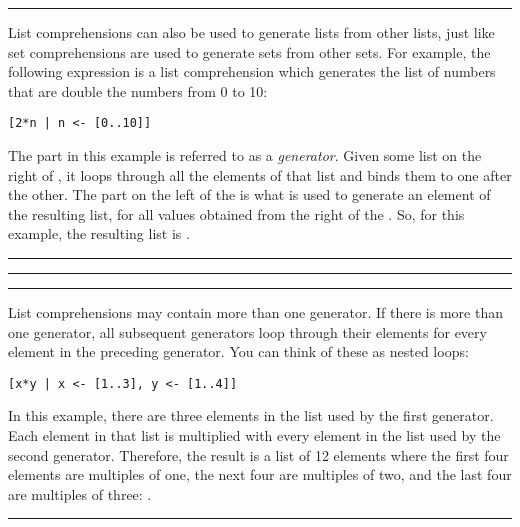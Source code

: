 \bigskip
\hrule
\bigskip
\pagebreak

List comprehensions can also be used to generate lists from other lists, just like set comprehensions are used to generate sets from other sets. For example, the following expression is a list comprehension which generates the list of numbers that are double the numbers from 0 to 10:
\begin{verbatim}
[2*n | n <- [0..10]]
\end{verbatim}
The  part in this example is referred to as a \emph{generator}. Given some list on the right of \haskellIn{<-}, it loops through all the elements of that list and binds them to  one after the other. The part on the left of the \haskellIn{|} is what is used to generate an element of the resulting list, for all values obtained from the right of the \haskellIn{|}. So, for this example, the resulting list is \haskellIn{[0,2,4,6,8,10,12,14,16,18,20]}.

\bigskip
\hrule
\bigskip


\bigskip
\hrule
\bigskip


\bigskip
\hrule
\bigskip

List comprehensions may contain more than one generator. If there is more than one generator, all subsequent generators loop through their elements for every element in the preceding generator. You can think of these as nested loops:
\begin{verbatim}
[x*y | x <- [1..3], y <- [1..4]]
\end{verbatim}
In this example, there are three elements in the list used by the first generator. Each element in that list is multiplied with every element in the list used by the second generator. Therefore, the result is a list of 12 elements where the first four elements are multiples of one, the next four are multiples of two, and the last four are multiples of three: \haskellIn{[1,2,3,4,2,4,6,8,3,6,9,12]}.

\bigskip
\hrule
\bigskip


